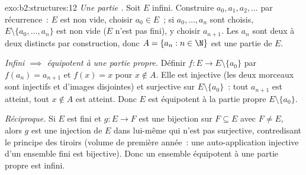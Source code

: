 \begin{solution}{exo:b2:structures:12}
\emph{Une partie .} Soit $E$ infini. Construire $a_0,
a_1, a_2, \dots$ par récurrence~: $E$ est non vide, choisir $a_0 \in
E$~; si $a_0, \dots, a_n$ sont choisis, $E \setminus \{a_0, \dots,
a_n\}$ est non vide ($E$ n'est pas fini), y choisir $a_{n+1}$. Les
$a_n$ sont deux à deux distincts par construction, donc $A = \{a_n : n
\in \N\}$ est une partie  de $E$.

\emph{Infini $\implies$ équipotent à une partie propre.} Définir
$f \colon E \to E \setminus \{a_0\}$ par $f(a_n) = a_{n+1}$ et
$f(x) = x$ pour $x \notin A$. Elle est injective (les deux morceaux
sont injectifs et d'images disjointes) et surjective sur $E \setminus
\{a_0\}$~: tout $a_{n+1}$ est atteint, tout $x \notin A$ est atteint.
Donc $E$ est équipotent à la partie propre $E \setminus \{a_0\}$.

\emph{Réciproque.} Si $E$ est fini et $g \colon E \to F$ est une
bijection sur $F \subseteq E$ avec $F \neq E$, alors $g$ est une
injection de $E$ dans lui-même qui n'est pas surjective,
contredisant le principe des tiroirs (volume de première année~: une
auto-application injective d'un ensemble fini est bijective). Donc un
ensemble équipotent à une partie propre est infini.
\end{solution}

